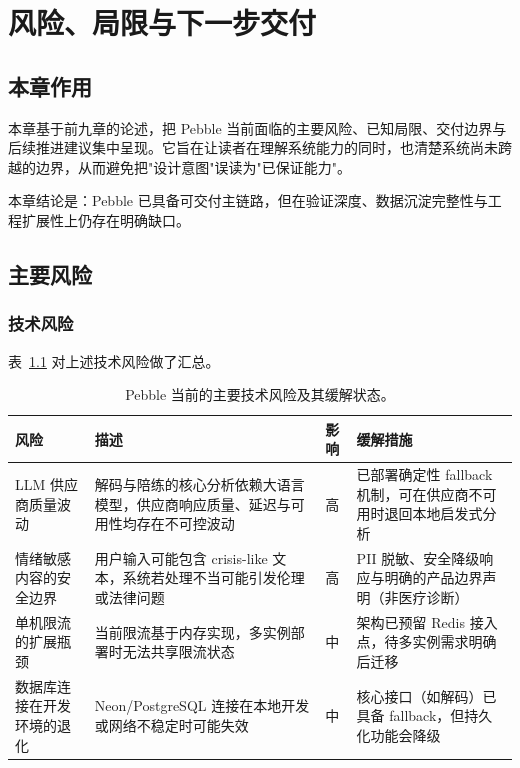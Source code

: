 \chapter{风险、局限与下一步交付}

\section{本章作用}

本章基于前九章的论述，把 Pebble 当前面临的主要风险、已知局限、交付边界与后续推进建议集中呈现。它旨在让读者在理解系统能力的同时，也清楚系统尚未跨越的边界，从而避免把"设计意图"误读为"已保证能力"。

本章结论是：Pebble 已具备可交付主链路，但在验证深度、数据沉淀完整性与工程扩展性上仍存在明确缺口。

\section{主要风险}

\subsection{技术风险}

表~\ref{tab:pebble-tech-risks} 对上述技术风险做了汇总。

\begin{table}[H]
  \centering
  \caption{Pebble 当前的主要技术风险及其缓解状态。}
  \label{tab:pebble-tech-risks}
  \begin{tabularx}{\textwidth}{>{\raggedright\arraybackslash}p{2.8cm} >{\raggedright\arraybackslash}X >{\raggedright\arraybackslash}p{2.5cm} >{\raggedright\arraybackslash}p{2.5cm}}
    \toprule
    风险 & 描述 & 影响 & 缓解措施 \\
    \midrule
    LLM 供应商质量波动 & 解码与陪练的核心分析依赖大语言模型，供应商响应质量、延迟与可用性均存在不可控波动 & 高 & 已部署确定性 fallback 机制，可在供应商不可用时退回本地启发式分析 \\
    情绪敏感内容的安全边界 & 用户输入可能包含 crisis-like 文本，系统若处理不当可能引发伦理或法律问题 & 高 & PII 脱敏、安全降级响应与明确的产品边界声明（非医疗诊断） \\
    单机限流的扩展瓶颈 & 当前限流基于内存实现，多实例部署时无法共享限流状态 & 中 & 架构已预留 Redis 接入点，待多实例需求明确后迁移 \\
    数据库连接在开发环境的退化 & Neon/PostgreSQL 连接在本地开发或网络不稳定时可能失效 & 中 & 核心接口（如解码）已具备 fallback，但持久化功能会降级 \\
    \bottomrule
  \end{tabularx}
\end{table}

